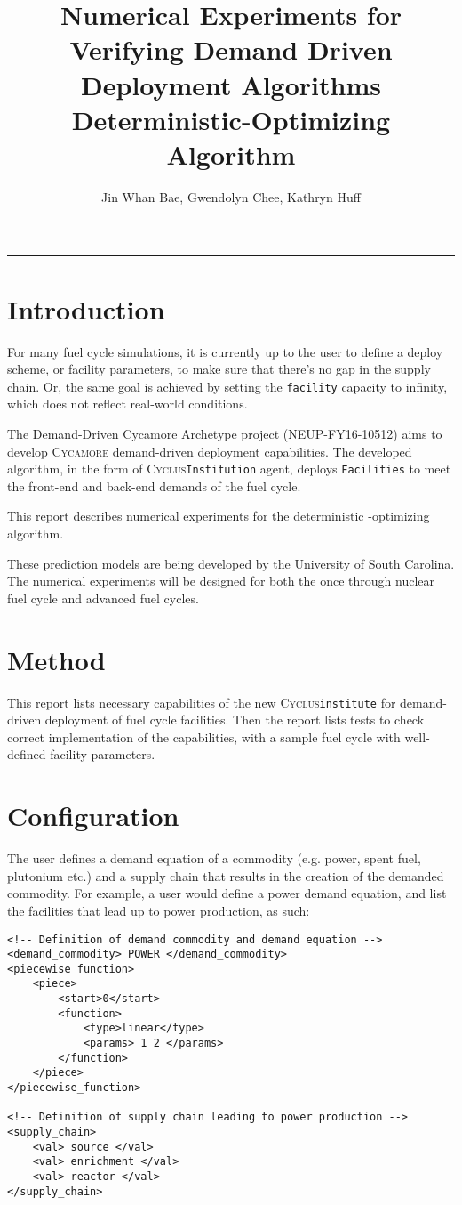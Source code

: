 \documentclass[11pt,letterpaper]{article}
\title{Numerical Experiments for Verifying Demand Driven Deployment Algorithms 
        \\ \vspace{0.5em} Deterministic-Optimizing Algorithm}
\author{Jin Whan Bae, Gwendolyn Chee, Kathryn Huff}
\newcommand{\Cyclus}{\textsc{Cyclus}\xspace}%
\newcommand{\Cycamore}{\textsc{Cycamore}\xspace}%
\begin{document}
	\maketitle
	\hrule

\section{Introduction}
For many fuel cycle simulations, it is currently up to the user to define
a deploy scheme, or facility parameters, to make sure that there's no gap
in the supply chain. Or, the same goal is achieved by setting the
\texttt{facility} capacity to infinity, which does not reflect real-world
conditions. 

The Demand-Driven Cycamore Archetype project (NEUP-FY16-10512) aims to develop \Cycamore demand-driven deployment capabilities.
The developed algorithm, in the form of \Cyclus \texttt{Institution}
agent, deploys \texttt{Facilities} to meet the front-end and back-end demands of the 
fuel cycle.

This report describes numerical experiments for the deterministic
-optimizing algorithm.

These prediction models are being developed by the University of South Carolina. The numerical experiments will be designed for both
 the once through nuclear fuel 
cycle and advanced fuel cycles. 

\section{Method}
This report lists necessary capabilities of the new \Cyclus \texttt{institute}
for demand-driven deployment of fuel cycle facilities. 
Then the report lists tests to check correct implementation of the capabilities,
with a sample fuel cycle with well-defined facility parameters.


\section{Configuration}
The user defines a demand equation of a commodity (e.g. power, spent fuel, plutonium etc.)
and a supply chain that results in the creation of the demanded commodity.
For example, a user would define a power demand equation, and list
the facilities that lead up to power production, as such:

\begin{verbatim}
<!-- Definition of demand commodity and demand equation -->
<demand_commodity> POWER </demand_commodity>
<piecewise_function>
	<piece>
		<start>0</start>
		<function>
			<type>linear</type>
			<params> 1 2 </params>
		</function>
	</piece>
</piecewise_function>

<!-- Definition of supply chain leading to power production -->
<supply_chain>
	<val> source </val>
	<val> enrichment </val>
	<val> reactor </val>
</supply_chain>
\end{verbatim}
\end{document}
